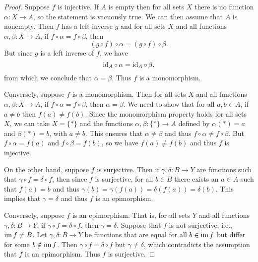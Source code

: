\begin{proof}
    Suppose \(f\) is injective. If \(A\) is empty then for all sets \(X\) there is no function \(\alpha: X \to A\), so the statement is vacuously true. We can then assume that \(A\) is nonempty. Then \(f\) has a left inverse \(g\) and for all sets \(X\) and all functions \(\alpha, \beta: X \to A\), if \(f \circ \alpha = f \circ \beta\),
    then 
    \[
        (g \circ f)\circ \alpha = (g \circ f) \circ \beta.
    \]
    But since \(g\) is a left inverse of \(f\), we have
    \[
        \operatorname{id}_A \circ\,\alpha = \operatorname{id}_A \circ\,\beta,
    \]
    from which we conclude that \(\alpha = \beta\). Thus \(f\) is a monomorphism. 
    
    Conversely, suppose \(f\) is a monomorphism. Then for all sets \(X\) and all functions \(\alpha, \beta: X \to A\), if \(f \circ \alpha = f \circ \beta\), then \(\alpha = \beta\). We need to show that for all \(a, b \in A\), if \(a \neq b\) then \(f(a) \neq f(b)\). Since the monomorphism property holds for all sets \(X\), we can take \(X = \{*\}\) and the functions \(\alpha, \beta: \{*\} \to A\) defined by \(\alpha(*) = a\) and \(\beta(*) = b\), with \(a \neq b\). This ensures that \(\alpha \neq \beta\) and thus \(f \circ \alpha \neq f \circ \beta\). But \(f \circ \alpha = f(a)\) and \(f \circ \beta = f(b)\), so we have \(f(a) \neq f(b)\) and thus \(f\) is injective.

    On the other hand, suppose \(f\) is surjective. Then if \(\gamma, \delta: B \to Y\) are functions such that \(\gamma \circ f = \delta \circ f\), then since \(f\) is surjective, for all \(b \in B\) there exists an \(a \in A\) such that \(f(a) = b\) and thus \(\gamma(b) = \gamma(f(a)) = \delta(f(a)) = \delta(b)\). This implies that \(\gamma = \delta\) and thus \(f\) is an epimorphism.

    Conversely, suppose \(f\) is an epimorphism. That is, for all sets \(Y\) and all functions \(\gamma, \delta: B \to Y\), if \(\gamma \circ f = \delta \circ f\), then \(\gamma = \delta\). Suppose that \(f\) is not surjective, i.e., \(\operatorname{im} f \neq B\). Let \(\gamma, \delta: B \to Y\) be functions that are equal for all \(b \in \operatorname{im} f\) but differ for some \(b \notin \operatorname{im} f\). Then \(\gamma \circ f = \delta \circ f\) but \(\gamma \neq \delta\), which contradicts the assumption that \(f\) is an epimorphism. Thus \(f\) is surjective.
\end{proof}

